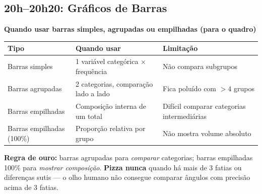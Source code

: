 \subsection{20h–20h20: Gráficos de Barras}

\begin{BoardBox}
\textbf{Quando usar barras simples, agrupadas ou empilhadas (para o quadro)}

\begin{tabular}{|l|p{5cm}|p{5.5cm}|}
\hline
\textbf{Tipo} & \textbf{Quando usar} & \textbf{Limitação} \\
\hline
Barras simples & 1 variável categórica × frequência & Não compara subgrupos \\
Barras agrupadas & 2 categorias, comparação lado a lado & Fica poluído com $>4$ grupos \\
Barras empilhadas & Composição interna de um total & Difícil comparar categorias intermediárias \\
Barras empilhadas (100\%) & Proporção relativa por grupo & Não mostra volume absoluto \\
\hline
\end{tabular}

\textbf{Regra de ouro:} barras agrupadas para \emph{comparar} categorias;
barras empilhadas 100\% para \emph{mostrar composição}.
\textbf{Pizza nunca} quando há mais de 3 fatias ou diferenças sutis — o olho humano
não consegue comparar ângulos com precisão acima de 3 fatias.
\end{BoardBox}

